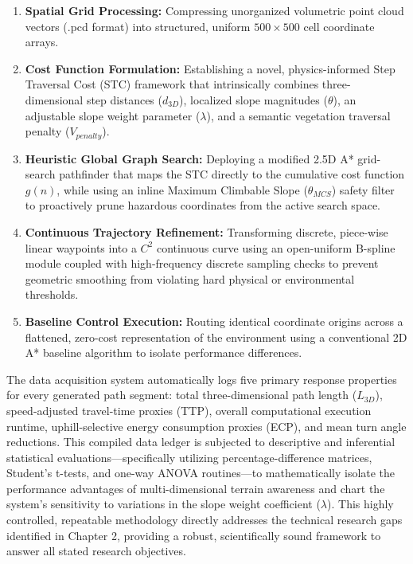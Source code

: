 \begin{enumerate}
    \item \textbf{Spatial Grid Processing:} Compressing unorganized volumetric point cloud vectors (.pcd format) into structured, uniform $500 \times 500$ cell coordinate arrays.

    \item \textbf{Cost Function Formulation:} Establishing a novel, physics-informed Step Traversal Cost (STC) framework that intrinsically combines three-dimensional step distances ($d_{3D}$), localized slope magnitudes ($\theta$), an adjustable slope weight parameter ($\lambda$), and a semantic vegetation traversal penalty ($V_{penalty}$).

    \item \textbf{Heuristic Global Graph Search:} Deploying a modified 2.5D A* grid-search pathfinder that maps the STC directly to the cumulative cost function $g(n)$, while using an inline Maximum Climbable Slope ($\theta_{MCS}$) safety filter to proactively prune hazardous coordinates from the active search space.

    \item \textbf{Continuous Trajectory Refinement:} Transforming discrete, piece-wise linear waypoints into a $C^2$ continuous curve using an open-uniform B-spline module coupled with high-frequency discrete sampling checks to prevent geometric smoothing from violating hard physical or environmental thresholds.

    \item \textbf{Baseline Control Execution:} Routing identical coordinate origins across a flattened, zero-cost representation of the environment using a conventional 2D A* baseline algorithm to isolate performance differences.
\end{enumerate}

The data acquisition system automatically logs five primary response properties for every generated
path segment: total three-dimensional path length ($L_{3D}$), speed-adjusted travel-time proxies
(TTP), overall computational execution runtime, uphill-selective energy consumption proxies (ECP),
and mean turn angle reductions. This compiled data ledger is subjected to descriptive and
inferential statistical evaluations---specifically utilizing percentage-difference matrices,
Student's t-tests, and one-way ANOVA routines---to mathematically isolate the performance advantages
of multi-dimensional terrain awareness and chart the system's sensitivity to variations in the slope
weight coefficient ($\lambda$). This highly controlled, repeatable methodology directly addresses
the technical research gaps identified in Chapter 2, providing a robust, scientifically sound
framework to answer all stated research objectives.
